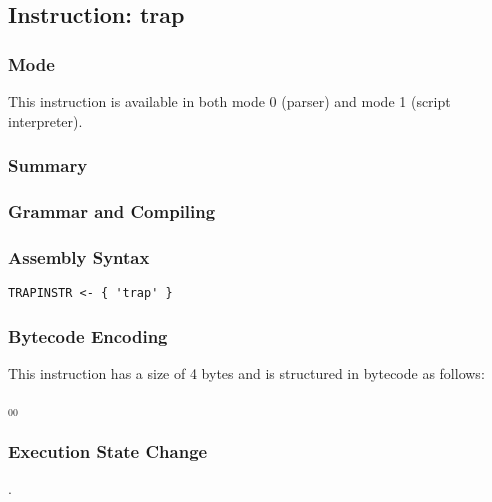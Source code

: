 \subsection{Instruction: trap}

\subsubsection{Mode}
This instruction is available in both mode 0 (parser) and mode 1 (script interpreter).
\subsubsection{Summary}


\subsubsection{Grammar and Compiling}


\subsubsection{Assembly Syntax}

\begin{myquote}
\begin{verbatim}
TRAPINSTR <- { 'trap' }
\end{verbatim}
\end{myquote}

\subsubsection{Bytecode Encoding}

This instruction has a size of 4 bytes and is structured in bytecode as follows:

$_{00}$\ 

\subsubsection{Execution State Change}

.


